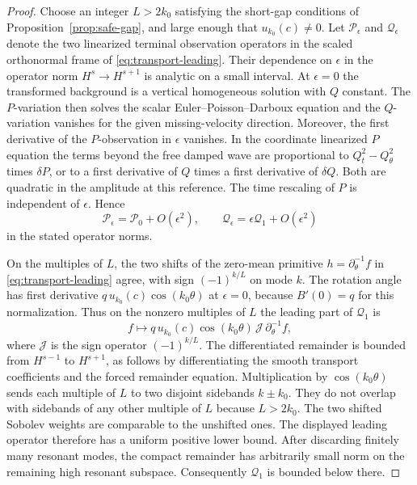 \begin{proof}
Choose an integer $L>2k_0$ satisfying the short-gap
conditions of Proposition~\ref{prop:safe-gap}, and
large enough that $u_{k_0}(c)\ne0$.
Let $\mathcal P_\epsilon$ and $\mathcal Q_\epsilon$
denote the two linearized terminal observation
operators in the scaled orthonormal frame of
\eqref{eq:transport-leading}. Their dependence on
$\epsilon$ in the operator norm $H^s\to H^{s+1}$
is analytic on a small interval.
At $\epsilon=0$ the transformed background is a
vertical homogeneous solution with $Q$ constant.
The $P$-variation then solves the scalar
Euler--Poisson--Darboux equation and the $Q$-variation
vanishes for the given missing-velocity direction.
Moreover, the first derivative of the $P$-observation
in $\epsilon$ vanishes. In the coordinate linearized
$P$ equation the terms beyond the free damped wave
are proportional to $Q_t^2-Q_\theta^2$ times
$\delta P$, or to a first derivative of $Q$ times
a first derivative of $\delta Q$.
Both are quadratic in the amplitude at this
reference. The time rescaling of $P$ is independent
of $\epsilon$. Hence
\[
 \mathcal P_\epsilon=\mathcal P_0+O(\epsilon^2),
 \qquad
 \mathcal Q_\epsilon=\epsilon\mathcal Q_1+O(\epsilon^2)
\]
in the stated operator norms.

On the multiples of $L$, the two shifts of the
zero-mean primitive $h=\partial_\theta^{-1}f$ in
\eqref{eq:transport-leading} agree, with sign
$(-1)^{k/L}$ on mode $k$.
The rotation angle has first derivative
$q\,u_{k_0}(c)\cos(k_0\theta)$ at $\epsilon=0$,
because $B'(0)=q$ for this normalization.
Thus on the nonzero multiples of $L$ the leading
part of $\mathcal Q_1$ is
\[
 f\longmapsto q\,u_{k_0}(c)\cos(k_0\theta)\,
                 \mathcal J\,\partial_\theta^{-1}f ,
\]
where $\mathcal J$ is the sign operator
$(-1)^{k/L}$.
The differentiated remainder is bounded
from $H^{s-1}$ to $H^{s+1}$, as follows by
differentiating the smooth transport coefficients
and the forced remainder equation.
Multiplication by $\cos(k_0\theta)$ sends each
multiple of $L$ to two disjoint sidebands
$k\pm k_0$. They do not overlap with sidebands
of any other multiple of $L$ because $L>2k_0$.
The two shifted Sobolev weights are comparable to
the unshifted ones. The displayed leading operator
therefore has a uniform positive lower bound.
After discarding finitely many resonant modes,
the compact remainder has arbitrarily small norm
on the remaining high resonant subspace.
Consequently $\mathcal Q_1$ is bounded below there.


\end{proof}
